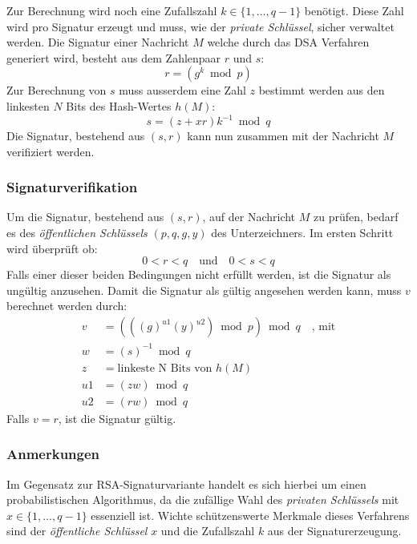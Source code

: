 \documentclass[11pt,a4paper,ngerman]{report}
\begin{document}
Zur Berechnung wird noch eine Zufallszahl $k \in \{ 1, \ldots, q - 1 \}$ benötigt. Diese Zahl wird pro Signatur erzeugt und muss, wie der \textit{private Schlüssel}, sicher verwaltet werden. Die Signatur einer Nachricht $M$ welche durch das DSA Verfahren generiert wird, besteht aus dem Zahlenpaar $r$ und $s$:
\[
    r = (g^k \bmod p)
\]
Zur Berechnung von $s$ muss ausserdem eine Zahl $z$ bestimmt werden aus den linkesten $N$ Bits des Hash-Wertes $h(M)$:
\[
    s = (z + xr)k^{-1} \bmod q
\]
Die Signatur, bestehend aus $(s, r)$ kann nun zusammen mit der Nachricht $M$ verifiziert werden.
\subsubsection{Signaturverifikation}
Um die Signatur, bestehend aus $(s, r)$, auf der Nachricht $M$ zu prüfen, bedarf es des \textit{öffentlichen Schlüssels} $(p, q, g, y)$ des Unterzeichners. Im ersten Schritt wird überprüft ob: 
\[
    0 < r < q \quad\textrm{und}\quad 0 < s < q
\]
Falls einer dieser beiden Bedingungen nicht erfüllt werden, ist die Signatur als ungültig anzusehen. Damit die Signatur als gültig angesehen werden kann, muss $v$ berechnet werden durch:
\begin{align*}
    v& = (((g)^{u1}(y)^{u2}) \bmod p) \bmod q \quad\textrm{, mit}\\
    w& = (s)^{-1} \bmod q \\
    z& = \textrm{linkeste N Bits von $h(M)$} \\
    u1& = (zw) \bmod q \\
    u2& = (rw) \bmod q
\end{align*}
Falls $v = r$, ist die Signatur gültig.
\subsubsection{Anmerkungen}
Im Gegensatz zur RSA-Signaturvariante handelt es sich hierbei um einen probabilistischen Algorithmus, da die zufällige Wahl des \textit{privaten Schlüssels} mit $x \in \{1, \ldots, q - 1 \}$ essenziell ist. Wichte schützenswerte Merkmale dieses Verfahrens sind der \textit{öffentliche Schlüssel} $x$ und die Zufallszahl $k$ aus der Signaturerzeugung.
\end{document}
